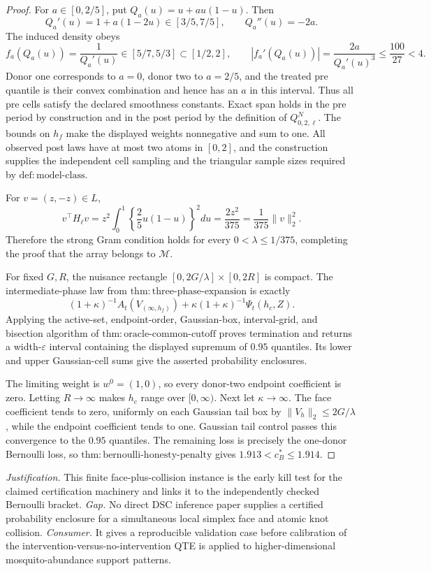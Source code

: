\documentclass{article}
\begin{document}
\begin{proof}
For \(a\in[0,2/5]\), put \(Q_a(u)=u+au(1-u)\).  Then
\[
 Q_a'(u)=1+a(1-2u)\in[3/5,7/5],
 \qquad Q_a''(u)=-2a.
\]
The induced density obeys
\[
 f_a(Q_a(u))=\frac1{Q_a'(u)}\in[5/7,5/3]\subset[1/2,2],
 \qquad
 |f_a'(Q_a(u))|=\frac{2a}{Q_a'(u)^3}
 \leq\frac{100}{27}<4.
\]
Donor one corresponds to \(a=0\), donor two to \(a=2/5\), and the treated pre quantile is their convex combination and hence has an \(a\) in this interval.  Thus all pre cells satisfy the declared smoothness constants.  Exact span holds in the pre period by construction and in the post period by the definition of \(Q^N_{0,2,\ell}\).  The bounds on \(h_f\) make the displayed weights nonnegative and sum to one.  All observed post laws have at most two atoms in \([0,2]\), and the construction supplies the independent cell sampling and the triangular sample sizes required by \(\mathrm{def:model\mbox{-}class}\).

For \(v=(z,-z)\in L\),
\[
 v^\top H_\ell v=z^2\int_0^1
 \left\{\frac25u(1-u)\right\}^2du
 =\frac{2z^2}{375}=\frac1{375}\|v\|_2^2.
\]
Therefore the strong Gram condition holds for every
\(0<\lambda\leq1/375\), completing the proof that the array belongs to \(\mathcal M\).

For fixed \(G,R\), the nuisance rectangle
\([0,2G/\lambda]\times[0,2R]\) is compact.  The intermediate-phase law from
\(\mathrm{thm:three\mbox{-}phase\mbox{-}expansion}\) is exactly
\[
 (1+\kappa)^{-1}A_t(V_{(\infty,h_f)})
 +\kappa(1+\kappa)^{-1}\Psi_t(h_c,Z).
\]
Applying the active-set, endpoint-order, Gaussian-box, interval-grid, and bisection algorithm of \(\mathrm{thm:oracle\mbox{-}common\mbox{-}cutoff}\) proves termination and returns a width-\(\varepsilon\) interval containing the displayed supremum of \(0.95\) quantiles.  Its lower and upper Gaussian-cell sums give the asserted probability enclosures.

The limiting weight is \(w^0=(1,0)\), so every donor-two endpoint coefficient is zero.  Letting \(R\to\infty\) makes \(h_c\) range over \([0,\infty)\).  Next let \(\kappa\to\infty\).  The face coefficient tends to zero, uniformly on each Gaussian tail box by \(\|V_h\|_2\leq2G/\lambda\), while the endpoint coefficient tends to one.  Gaussian tail control passes this convergence to the \(0.95\) quantiles.  The remaining loss is precisely the one-donor Bernoulli loss, so \(\mathrm{thm:bernoulli\mbox{-}honesty\mbox{-}penalty}\) gives
\(1.913<c_B^*\leq1.914\).
\end{proof}
\par\smallskip\noindent \textit{Justification.} This finite face-plus-collision instance is the early kill test for the claimed certification machinery and links it to the independently checked Bernoulli bracket. \textit{Gap.} No direct DSC inference paper supplies a certified probability enclosure for a simultaneous local simplex face and atomic knot collision. \textit{Consumer.} It gives a reproducible validation case before calibration of the intervention-versus-no-intervention QTE is applied to higher-dimensional mosquito-abundance support patterns.
\end{document}
